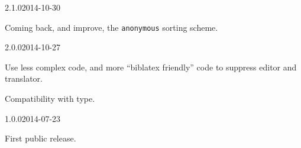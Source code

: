\documentclass{ltxdockit}[2011/03/25]
\begin{document}
\begin{changelog}
\begin{release}{2.1.0}{2014-10-30}
\item Coming back, and improve, the \verb+anonymous+ sorting scheme.
\end{release}

\begin{release}{2.0.0}{2014-10-27}
\item Use less complex code, and more \enquote{biblatex friendly} code to suppress editor and translator.
\item Compatibility with  type.
\end{release}

\begin{release}{1.0.0}{2014-07-23}
\item First public release.
\end{release}
\end{changelog}
\end{document}
